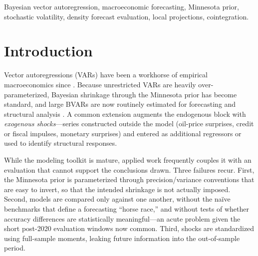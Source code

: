 \documentclass[conference]{IEEEtran}
\begin{document}
\begin{IEEEkeywords}
Bayesian vector autoregression, macroeconomic forecasting, Minnesota prior,
stochastic volatility, density forecast evaluation, local projections,
cointegration.
\end{IEEEkeywords}

\section{Introduction}
Vector autoregressions (VARs) have been a workhorse of empirical
macroeconomics since \cite{sims1980}. Because unrestricted VARs are heavily
over-parameterized, Bayesian shrinkage through the Minnesota prior
\cite{litterman1986,doan1984} has become standard, and large BVARs are now
routinely estimated for forecasting and structural analysis
\cite{bgr2010,koop2010}. A common extension augments the endogenous block with
\emph{exogenous shocks}---series constructed outside the model (oil-price
surprises, credit or fiscal impulses, monetary surprises) and entered as
additional regressors or used to identify structural responses.

While the modeling toolkit is mature, applied work frequently couples it with an
evaluation that cannot support the conclusions drawn. Three failures recur.
First, the Minnesota prior is parameterized through precision/variance
conventions that are easy to invert, so that the intended shrinkage is not
actually imposed. Second, models are compared only against one another, without
the na\"ive benchmarks that define a forecasting ``horse race,'' and without
tests of whether accuracy differences are statistically meaningful---an acute
problem given the short post-2020 evaluation windows now common. Third, shocks
are standardized using full-sample moments, leaking future information into the
out-of-sample period.
\end{document}
